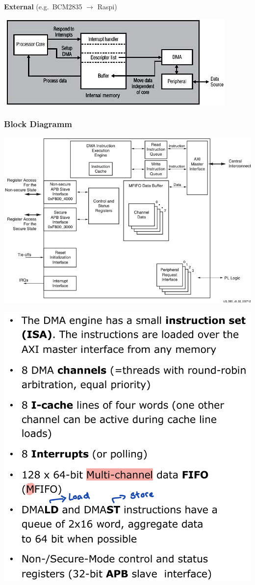 \documentclass[
  10pt,
  a4paper,
]{article}
\begin{document}
\begin{multicols*}{2}
\textbf{External} (e.g.~BCM2835 \(\rightarrow\) Raspi)

\includegraphics{images/performance/image-16.png}

\subsubsection{Block Diagramm}\label{block-diagramm}

\includegraphics{images/performance/image-15.png}

\includegraphics{images/performance/image-31.png}


\end{multicols*}
\end{document}
